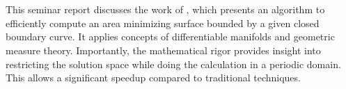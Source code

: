\section*{}
\label{sec:abstract}

This seminar report discusses the work of \textcite{wang2021computing}, which presents an algorithm to efficiently compute an area minimizing surface bounded by a given closed boundary curve.
It applies concepts of differentiable manifolds and geometric measure theory.
Importantly, the mathematical rigor provides insight into restricting the solution space while doing the calculation in a periodic domain.
This allows a significant speedup compared to traditional techniques.
